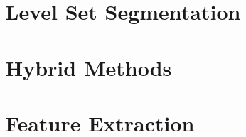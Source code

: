 \clearpage

\section{Level Set Segmentation}
\label{sec:LevelSetsSegmentation}
\ifitkFullVersion 
%
\fi


\section{Hybrid Methods} 
\label{sec:HybridSegmentationMethods}

\ifitkFullVersion 
%
\fi


\section{Feature Extraction} 
\label{sec:FeatureExtractionMethods}

\ifitkFullVersion 
%
\fi



